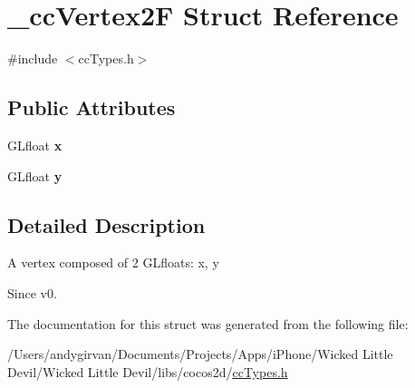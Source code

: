 \hypertarget{struct__cc_vertex2_f}{\section{\-\_\-cc\-Vertex2\-F Struct Reference}
\label{struct__cc_vertex2_f}
}


{\ttfamily \#include $<$cc\-Types.\-h$>$}

\subsection*{Public Attributes}
\begin{DoxyCompactItemize}
\item 
\hypertarget{struct__cc_vertex2_f_ab23767055ea1850786a4e01a0955a45a}{G\-Lfloat {\bfseries x}}\label{struct__cc_vertex2_f_ab23767055ea1850786a4e01a0955a45a}

\item 
\hypertarget{struct__cc_vertex2_f_a4df0354a4460724a818419ce251d863a}{G\-Lfloat {\bfseries y}}\label{struct__cc_vertex2_f_a4df0354a4460724a818419ce251d863a}

\end{DoxyCompactItemize}


\subsection{Detailed Description}
A vertex composed of 2 G\-Lfloats\-: x, y \begin{DoxySince}{Since}
v0. 
\end{DoxySince}


The documentation for this struct was generated from the following file\-:\begin{DoxyCompactItemize}
\item 
/\-Users/andygirvan/\-Documents/\-Projects/\-Apps/i\-Phone/\-Wicked Little Devil/\-Wicked Little Devil/libs/cocos2d/\hyperlink{cc_types_8h}{cc\-Types.\-h}\end{DoxyCompactItemize}
